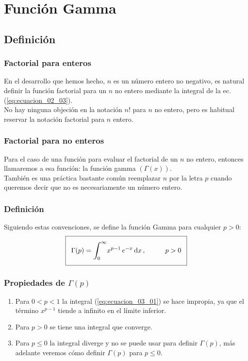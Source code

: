 \documentclass[12pt]{beamer}
\begin{document}
\section{Función Gamma}
\subsection{Definición}

\begin{frame}
\frametitle{Factorial para enteros}
En el desarrollo que hemos hecho, $n$ es un número entero no negativo, es natural definir la función factorial para un $n$ no entero mediante la integral de la ec.(\ref{eq:ecuacion_02_03}).
\\
\bigskip
\pause
No hay ninguna objeción en la notación $n!$ para $n$ no entero, pero es habitual reservar la notación factorial para $n$ entero.
\end{frame}
\begin{frame}
\frametitle{Factorial para no enteros}
Para el caso de una función para evaluar el factorial de un $n$ no entero, entonces llamaremos a esa función: la función gamma $(\Gamma (x))$.
\\
\bigskip
\pause
También es una práctica bastante común reemplazar $n$ por la letra $p$ cuando queremos decir que no es necesariamente un número entero.
\end{frame}
\begin{frame}
\frametitle{Definición}
Siguiendo estas convenciones, se define la función Gamma para cualquier $p > 0$:
\pause
\begin{align}\addtolength{\fboxsep}{5pt}\boxed{
\Gamma (p) = \scaleint{6ex}_{\bs 0}^{\infty} x^{p-1} \, e^{-x} \dd{x}, \hspace{1cm} p > 0}
\label{eq:ecuacion_03_01}
\end{align}
\end{frame}
\begin{frame}
\frametitle{Propiedades de $\Gamma (p)$}
\begin{enumerate}[<+->]
\item Para $0 < p < 1$ la integral (\ref{eq:ecuacion_03_01}) se hace impropia, ya que el término $x^{p-1}$ tiende a infinito en el límite inferior.
\item Para $p > 0$ se tiene una integral que converge.
\item Para $p \leq 0$ la integral diverge y no se puede usar para definir $\Gamma (p)$, más adelante veremos cómo definir  $\Gamma (p)$ para $p \leq 0$.
\end{enumerate}
\end{frame}
\end{document}
